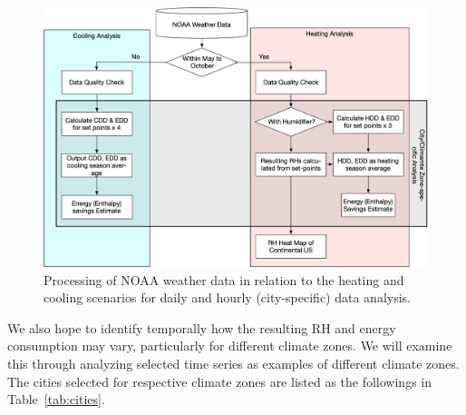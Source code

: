 \begin{figure}[h!]
\includegraphics[width=\textwidth]{diagram_radhum}
\caption{Processing of NOAA weather data in relation to the heating and cooling scenarios for daily and hourly (city-specific) data analysis.}\label{fg:process}
\end{figure}

We also hope to identify temporally how the resulting RH and energy consumption may vary, particularly for different climate zones. We will examine this through analyzing selected time series as examples of different climate zones. The cities selected for respective climate zones are listed as the followings in Table~\ref{tab:cities}.


